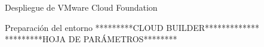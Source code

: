 \begin{section}{Despliegue de VMware Cloud Foundation}
\begin{subsection}{Preparación del entorno}
*********CLOUD BUILDER*************\\

*********HOJA DE PARÁMETROS********\\
\end{subsection}
\end{section}